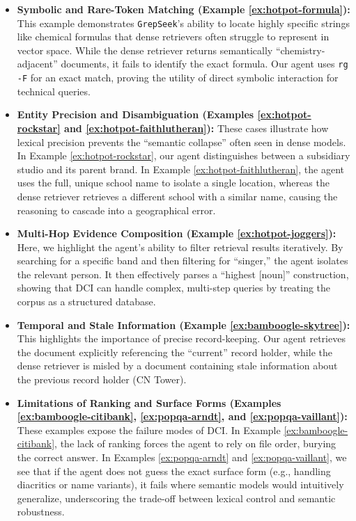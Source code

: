 \documentclass{llmxive}
\providecommand{\ourmethod}{\texttt{GrepSeek}\xspace}
\begin{document}
\begin{itemize}
    \item \textbf{Symbolic and Rare-Token Matching (Example \ref{ex:hotpot-formula}):} This example demonstrates \ourmethod{}'s ability to locate highly specific strings like chemical formulas that dense retrievers often struggle to represent in vector space. While the dense retriever returns semantically ``chemistry-adjacent'' documents, it fails to identify the exact formula. Our agent uses \texttt{rg -F} for an exact match, proving the utility of direct symbolic interaction for technical queries.
    
    \item \textbf{Entity Precision and Disambiguation (Examples \ref{ex:hotpot-rockstar} and \ref{ex:hotpot-faithlutheran}):} These cases illustrate how lexical precision prevents the ``semantic collapse'' often seen in dense models. In Example \ref{ex:hotpot-rockstar}, our agent distinguishes between a subsidiary studio and its parent brand. In Example \ref{ex:hotpot-faithlutheran}, the agent uses the full, unique school name to isolate a single location, whereas the dense retriever retrieves a different school with a similar name, causing the reasoning to cascade into a geographical error.
    
    \item \textbf{Multi-Hop Evidence Composition (Example \ref{ex:hotpot-joggers}):} Here, we highlight the agent's ability to filter retrieval results iteratively. By searching for a specific band and then filtering for ``singer,'' the agent isolates the relevant person. It then effectively parses a ``highest [noun]'' construction, showing that DCI can handle complex, multi-step queries by treating the corpus as a structured database.
    
    \item \textbf{Temporal and Stale Information (Example \ref{ex:bamboogle-skytree}):} This highlights the importance of precise record-keeping. Our agent retrieves the document explicitly referencing the ``current'' record holder, while the dense retriever is misled by a document containing stale information about the previous record holder (CN Tower).
    
    \item \textbf{Limitations of Ranking and Surface Forms (Examples \ref{ex:bamboogle-citibank}, \ref{ex:popqa-arndt}, and \ref{ex:popqa-vaillant}):} These examples expose the failure modes of DCI. In Example \ref{ex:bamboogle-citibank}, the lack of ranking forces the agent to rely on file order, burying the correct answer. In Examples \ref{ex:popqa-arndt} and \ref{ex:popqa-vaillant}, we see that if the agent does not guess the exact surface form (e.g., handling diacritics or name variants), it fails where semantic models would intuitively generalize, underscoring the trade-off between lexical control and semantic robustness.
\end{itemize}
\end{document}
